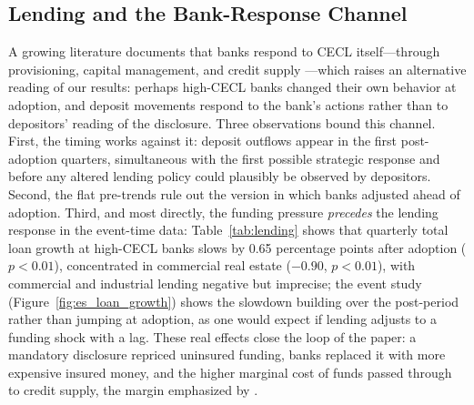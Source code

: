 \subsection{Lending and the Bank-Response Channel}
\label{sec:robustness:lending}

A growing literature documents that banks respond to CECL itself---through
provisioning, capital management, and credit supply
\citep{granja2025current, chen2022does, kim2026current}---which raises an
alternative reading of our results: perhaps high-CECL banks changed their own
behavior at adoption, and deposit movements respond to the bank's actions
rather than to depositors' reading of the disclosure.  Three observations
bound this channel.  First, the timing works against it: deposit outflows
appear in the first post-adoption quarters, simultaneous with the first
possible strategic response and before any altered lending policy could
plausibly be observed by depositors.  Second, the flat pre-trends rule out
the version in which banks adjusted ahead of adoption.  Third, and most
directly, the funding pressure \emph{precedes} the lending response in the
event-time data: Table~\ref{tab:lending} shows that quarterly total loan
growth at high-CECL banks slows by 0.65 percentage points after adoption
($p < 0.01$), concentrated in commercial real estate ($-0.90$, $p < 0.01$),
with commercial and industrial lending negative but imprecise; the
event study (Figure~\ref{fig:es_loan_growth}) shows the slowdown building
over the post-period rather than jumping at adoption, as one would expect if
lending adjusts to a funding shock with a lag.  These real effects close the
loop of the paper: a mandatory disclosure repriced uninsured funding, banks
replaced it with more expensive insured money, and the higher marginal cost
of funds passed through to credit supply, the margin emphasized by
\citet{granja2025current}.
